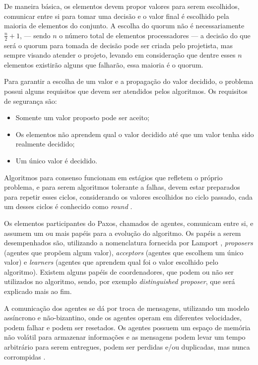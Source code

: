 \documentclass[
    12pt,
    openright, 
    oneside,
    a4paper,
    french,
    english,
    brazil
    ]{facom-ufu-abntex2}
\theoremstyle{definition}
\begin{document}
De maneira básica, os elementos devem propor valores para serem escolhidos, 
comunicar entre si para tomar uma decisão e o valor final é escolhido pela maioria de 
elementos do conjunto.
A escolha do quorum não é necessariamente $\frac{n}{2}+1$, --- sendo $n$ o número
total de elementos processadores --- a decisão do que será o quorum para tomada de decisão
pode ser criada pelo projetista, mas sempre visando atender o projeto, levando
em consideração que dentre esses $n$ elementos existirão alguns que falharão, essa maioria
é o quorum.

Para garantir a escolha de um valor e a propagação do valor decidido, o problema
possui alguns requisitos que devem ser atendidos pelos algoritmos. Os requisitos de
segurança são: 

\begin{itemize}
    \item Somente um valor proposto pode ser aceito;
    \item Os elementos não aprendem qual o valor decidido até que um valor 
    tenha sido realmente decidido;
    \item Um único valor é decidido.
\end{itemize}

Algoritmos para consenso funcionam em estágios que refletem o próprio problema, e para
serem algoritmos tolerante a falhas, devem estar preparados para repetir esses ciclos,
considerando os valores escolhidos no ciclo passado, cada um desses ciclos é conhecido como
\emph{round} \cite{camargos2008multicoordinated}.

Os elementos participantes do Paxos, chamados de agentes, comunicam entre si, e assumem 
um ou mais papéis para a evolução do algoritmo. Os papéis a serem desempenhados são, 
utilizando a nomenclatura fornecida por Lamport \cite{lamport2001paxos}, 
\emph{proposers} (agentes que propõem algum valor), \emph{acceptors} 
(agentes que escolhem um único valor) e \emph{learners} (agentes que aprendem
qual foi o valor escolhido pelo algoritmo).
Existem alguns papéis de coordenadores, que podem ou não ser utilizados no algoritmo, 
sendo, por exemplo \emph{distinguished proposer}, que será explicado mais ao fim.

A comunicação dos agentes se dá por troca de mensagens, utilizando um modelo assíncrono e
não-bizantino, onde os agentes operam em diferentes velocidades, podem falhar e podem ser
resetados. Os agentes possuem um espaço de memória não volátil para armazenar informações e
as mensagens podem levar um tempo arbitrário para serem entregues, podem ser perdidas e/ou 
duplicadas, mas nunca corrompidas \cite{lamport2001paxos}.
\end{document}
